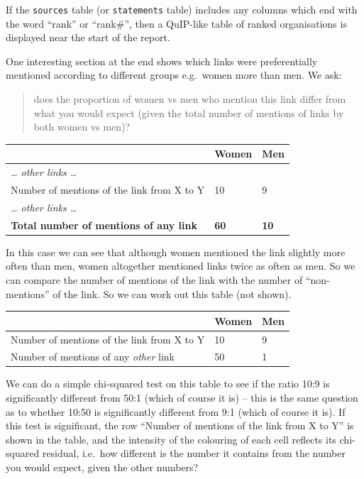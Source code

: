 \documentclass[
]{book}
\begin{document}
If the \texttt{sources} table (or \texttt{statements} table) includes any columns which end with the word ``rank'' or ``rank\#'', then a QuIP-like table of ranked organisations is displayed near the start of the report.

One interesting section at the end shows which links were preferentially mentioned according to different groups e.g.~women more than men. We ask:

\begin{quote}
does the proportion of women vs men who mention this link differ from what you would expect (given the total number of mentions of links by both women vs men)?
\end{quote}

\begin{longtable}[]{@{}lll@{}}
\toprule
& Women & Men \\
\midrule
\endhead
\emph{\ldots{} other links \ldots{}} & & \\
Number of mentions of the link from X to Y & 10 & 9 \\
\emph{\ldots{} other links \ldots{}} & & \\
\textbf{Total number of mentions of any link} & \textbf{60} & \textbf{10} \\
\bottomrule
\end{longtable}

In this case we can see that although women mentioned the link slightly more often than men, women altogether mentioned links twice as often as men. So we can compare the number of mentions of the link with the number of ``non-mentions'' of the link. So we can work out this table (not shown).

\begin{longtable}[]{@{}lll@{}}
\toprule
& Women & Men \\
\midrule
\endhead
Number of mentions of the link from X to Y & 10 & 9 \\
Number of mentions of any \emph{other} link & 50 & 1 \\
\bottomrule
\end{longtable}

We can do a simple chi-squared test on this table to see if the ratio 10:9 is significantly different from 50:1 (which of course it is) -- this is the same question as to whether 10:50 is significantly different from 9:1 (which of course it is). If this test is significant, the row ``Number of mentions of the link from X to Y'' is shown in the table, and the intensity of the colouring of each cell reflects its chi-squared residual, i.e.~how different is the number it contains from the number you would expect, given the other numbers?
\end{document}
